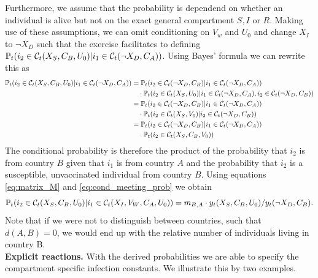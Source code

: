 Furthermore, we assume that the probability is dependend on whether an individual is alive but not on the exact general compartment $S, I$ or $R$. Making use of these assumptions, we can omit conditioning on $V_w$ and $U_0$ and change $X_I$ to $\neg X_D$ such that the exercise facilitates to defining $\mathbb{P}_t(i_2 \in \mathcal{C}_t(X_S, C_B, U_0)|i_1 \in \mathcal{C}_t(\neg X_D, C_A))$. Using Bayes' formula we can rewrite this as
\begin{align}
\label{eq:cond_meeting_prob}
\mathbb{P}_t(i_2 \in \mathcal{C}_t(X_S, C_B, U_0)|i_1 \in \mathcal{C}_t(\neg X_D, C_A)) &= \mathbb{P}_t(i_2 \in \mathcal{C}_t(\neg X_D, C_B) | i_1 \in \mathcal{C}_t(\neg X_D, C_A) )  \notag \\
& \quad \cdot \mathbb{P}_t(i_2 \in \mathcal{C}_t(X_S, U_0) | i_1 \in \mathcal{C}_t(\neg X_D, C_A), i_2 \in \mathcal{C}_t(\neg X_D, C_B) ) \notag \\
&= \mathbb{P}_t(i_2 \in \mathcal{C}_t(\neg X_D, C_B) | i_1 \in \mathcal{C}_t(\neg X_D, C_A) )  \notag \\
& \quad \cdot \mathbb{P}_t(i_2 \in \mathcal{C}_t(X_S, V_0)|i_2 \in \mathcal{C}_t(\neg X_D, C_B)) \notag\\
&= \mathbb{P}_t(i_2 \in \mathcal{C}_t(\neg X_D, C_B) | i_1 \in \mathcal{C}_t(\neg X_D, C_A) ) \notag \\
& \quad \cdot \mathbb{P}_t(i_2 \in \mathcal{C}_t(X_S, C_B, V_0))
\end{align} 
The conditional probability is therefore the product of the probability that $i_2$ is from country $B$ given that $i_1$ is from country $A$ and the probability that $i_2$ is a susceptible, unvaccinated individual from country $B$. Using equations \eqref{eq:matrix_M} and \eqref{eq:cond_meeting_prob} we obtain
\begin{align}
\label{eq:cond_prob_meeting_final}
\mathbb{P}_t(i_2 \in \mathcal{C}_t(X_S, C_B, U_0)|i_1 \in \mathcal{C}_t(X_I, V_W, C_A, U_0)) = m_{B,A} \cdot y_t(X_S, C_B, U_0) / y_t(\neg X_D, C_B). 
\end{align}
Note that if we were not to distinguish between countries, such that $d(A,B) = 0$, we would end up with the relative number of individuals living in country B. \\


\textbf{Explicit reactions.}
With the derived probabilities we are able to specify the compartment specific infection constants. We illustrate this by two examples. 

